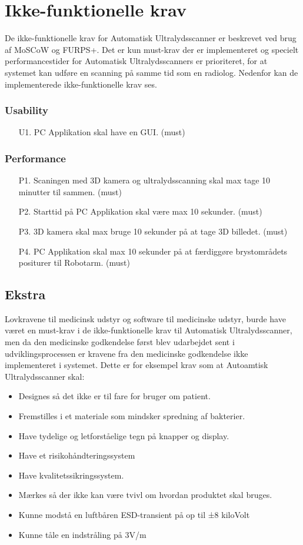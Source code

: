 \section{Ikke-funktionelle krav}
De ikke-funktionelle krav for Automatisk Ultralydsscanner er beskrevet ved brug af MoSCoW og FURPS+. Det er kun must-krav der er implementeret og specielt performancestider for Automatisk Ultralydsscanners er prioriteret, for at systemet kan udføre en scanning på samme tid som en radiolog. Nedenfor kan de implementerede ikke-funktionelle krav ses. 

\subsubsection{Usability}
\begin{itemize}
    \item [U1.] PC Applikation skal have en GUI. (must)
\end{itemize}

\subsubsection{Performance}
\begin{itemize}
    \item[P1.] Scaningen med 3D kamera og ultralydsscanning skal max tage 10 minutter til sammen. (must) 
    \item[P2.] Starttid på PC Applikation skal være max 10 sekunder. (must)
    \item[P3.] 3D kamera skal max bruge 10 sekunder på at tage 3D billedet. (must)
    \item[P4.] PC Applikation skal max 10 sekunder på at færdiggøre brystområdets positurer til Robotarm. (must)
\end{itemize}

\subsection{Ekstra}
Lovkravene til medicinsk udstyr og software til medicinske udstyr, burde have været en must-krav i de ikke-funktionelle krav til Automatisk Ultralydsscanner, men da den medicinske godkendelse først blev udarbejdet sent i udviklingsprocessen er kravene fra den medicinske godkendelse ikke implementeret i systemet. Dette er for eksempel krav som at Autoamtisk Ultralydsscanner skal: 

\begin{itemize}
\item Designes så det ikke er til fare for bruger om patient. 
\item Fremstilles i et materiale som mindsker spredning af bakterier. 
\item Have tydelige og letforståelige tegn på knapper og display.
\item Have et risikohåndteringssystem
\item Have kvalitetssikringssystem. 
\item Mærkes så der ikke kan være tvivl om hvordan produktet skal bruges.
\item Kunne modstå en luftbåren ESD-transient på op til ±8 kiloVolt
\item Kunne tåle en indstråling på 3V/m
\end{itemize}